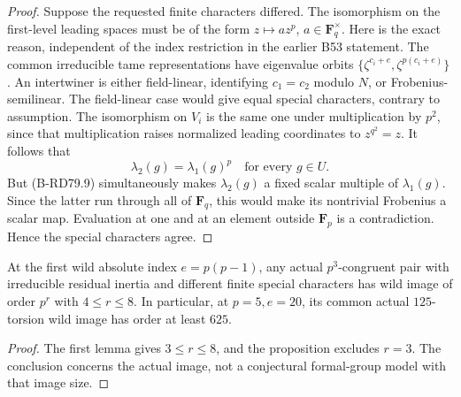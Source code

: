 \begin{proof}
Suppose the requested finite characters differed. The isomorphism
on the first-level leading spaces must be of the form
\(z\mapsto a z^p\), \(a\in\mathbf F_q^\times\).
Here is the exact reason, independent of the index restriction
in the earlier B53 statement. The common irreducible tame
representations have eigenvalue orbits
\(\{\zeta^{c_i+e},\zeta^{p(c_i+e)}\}\).
An intertwiner is either field-linear, identifying \(c_1=c_2\)
modulo \(N\), or Frobenius-semilinear. The field-linear case
would give equal special characters, contrary to assumption.
The isomorphism on \(V_i\) is the same one under multiplication
by \(p^2\), since that multiplication raises normalized leading
coordinates to \(z^{q^2}=z\).
It follows that
\[
            \lambda_2(g)=\lambda_1(g)^p
                        \quad\text{for every }g\in U.
                                                     \tag{B-RD79.10}
\]
But (B-RD79.9) simultaneously makes \(\lambda_2(g)\) a fixed
scalar multiple of \(\lambda_1(g)\). Since the latter run through
all of \(\mathbf F_q\), this would make its nontrivial Frobenius
a scalar map. Evaluation at one and at an element outside
\(\mathbf F_p\) is a contradiction. Hence the special characters
agree.
\end{proof}

\begin{corollary}
\label{cor:B-RD79}
At the first wild absolute index \(e=p(p-1)\), any actual
\(p^3\)-congruent pair with irreducible residual inertia and
different finite special characters has wild image of order
\(p^r\) with \(4\le r\le8\).
In particular, at \(p=5,e=20\), its common actual \(125\)-torsion
wild image has order at least \(625\).
\end{corollary}
\begin{proof}
The first lemma gives \(3\le r\le8\), and the proposition
excludes \(r=3\). The conclusion concerns the actual image,
not a conjectural formal-group model with that image size.
\end{proof}

